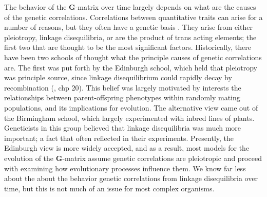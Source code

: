 \documentclass[11pt,twocolumn]{article}
\begin{document}
The behavior of the \textbf{G}-matrix over time largely depends on what are the causes of the genetic correlations. Correlations between quantitative traits can arise for a number of reasons, but they often have a genetic basis \citep{Saltz2017}. They arise from either pleiotropy, linkage disequilibria, or are the product of trans acting elements; the first two that are thought to be the most significant factors. Historically, there have been two schools of thought what the principle causes of genetic correlations are. The first was put forth by the Edinburgh school, which held that pleiotropy was principle source, since linkage disequilibrium could rapidly decay by recombination (\citep{fox2006evolutionary}, chp 20). This belief was largely motivated by interests the relationships between parent-offspring phenotypes within randomly mating populations, and its implications for evolution. The alternative view came out of the Birmingham school, which largely experimented with inbred lines of plants. Geneticists in this group believed that linkage disequilibria was much more important; a fact that often reflected in their experiments. Presently, the Edinburgh view is more widely accepted, and as a result, most models for the evolution of the \textbf{G}-matrix assume genetic correlations are pleiotropic and proceed with examining how evolutionary processes influence them. We know far less about the about the behavior genetic correlations from linkage disequilibria over time, but this is not much of an issue for most complex organisms.\par
% 
% 
% 
% 
\end{document}
